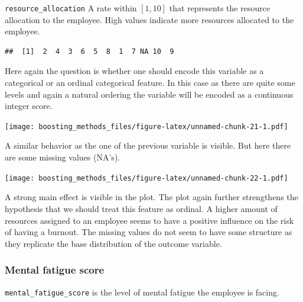 \documentclass[
]{book}
\newenvironment{Shaded}{\begin{snugshade}}{\end{snugshade}}
\newcommand{\CommentTok}[1]{\textcolor[rgb]{0.56,0.35,0.01}{\textit{#1}}}
\newcommand{\FunctionTok}[1]{\textcolor[rgb]{0.00,0.00,0.00}{#1}}
\newcommand{\NormalTok}[1]{#1}
\newcommand{\SpecialCharTok}[1]{\textcolor[rgb]{0.00,0.00,0.00}{#1}}
\begin{document}
\texttt{resource\_allocation} A rate within \([1,10]\) that represents the resource allocation to the employee. High values indicate more resources allocated to the employee.

\begin{Shaded}
\end{Shaded}

\begin{verbatim}
##  [1]  2  4  3  6  5  8  1  7 NA 10  9
\end{verbatim}

Here again the question is whether one should encode this variable as a categorical or an ordinal categorical feature. In this case as there are quite some levels and again a natural ordering the variable will be encoded as a continuous integer score.

\texttt{[image: boosting\_methods\_files/figure-latex/unnamed-chunk-21-1.pdf]}

A similar behavior as the one of the previous variable is visible. But here there are some missing values (NA's).

\texttt{[image: boosting\_methods\_files/figure-latex/unnamed-chunk-22-1.pdf]}

A strong main effect is visible in the plot. The plot again further strengthens the hypothesis that we should treat this feature as ordinal. A higher amount of resources assigned to an employee seems to have a positive influence on the risk of having a burnout. The missing values do not seem to have some structure as they replicate the base distribution of the outcome variable.

\hypertarget{mental-fatigue-score}{%
\subsubsection{Mental fatigue score}\label{mental-fatigue-score}}

\texttt{mental\_fatigue\_score} is the level of mental fatigue the employee is facing.

\begin{Shaded}
\end{Shaded}
\end{document}
